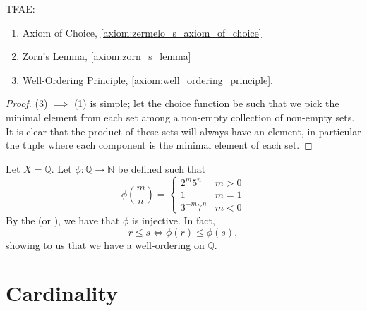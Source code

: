 \documentclass[notoc,notitlepage]{tufte-book}
\begin{document}
\begin{thm}
\label{thm:axioms_of_choice_and_its_equivalents}
  TFAE:
  \begin{enumerate}
    \item Axiom of Choice, \cref{axiom:zermelo_s_axiom_of_choice}
    \item Zorn's Lemma, \cref{axiom:zorn_s_lemma}
    \item Well-Ordering Principle, \cref{axiom:well_ordering_principle}.
  \end{enumerate}
\end{thm}

\begin{proof}
  (3) $\implies$ (1) is simple; let the choice function be such that we pick the minimal element from each set among a non-empty collection of non-empty sets. It is clear that the product of these sets will always have an element, in particular the tuple where each component is the minimal element of each set.

\end{proof}

\begin{eg}
  Let $X = \mathbb{Q}$. Let $\phi: \mathbb{Q} \to \mathbb{N}$ be defined such that
  \begin{equation*}
    \phi\left(\frac{m}{n}\right) = \begin{cases}
      2^m 5^n    & m > 0 \\
      1          & m = 1 \\
      3^{-m} 7^n & m < 0
    \end{cases}
  \end{equation*}
  By the  (or ), we have that $\phi$ is injective. In fact,
  \begin{equation*}
    r \leq s \iff \phi(r) \leq \phi(s),
  \end{equation*}
  showing to us that we have a well-ordering on $\mathbb{Q}$.
\end{eg}


\section{Cardinality}%
\label{sec:cardinality}
\end{document}
